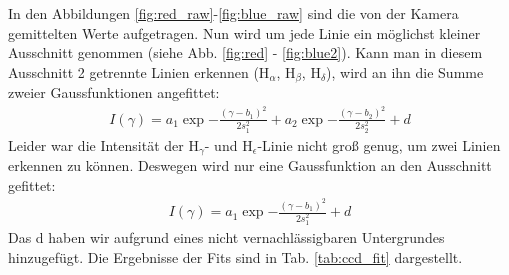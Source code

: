 In den Abbildungen \ref{fig:red_raw}-\ref{fig:blue_raw} sind die von der Kamera gemittelten Werte aufgetragen. Nun wird um jede Linie ein möglichst kleiner Ausschnitt genommen (siehe Abb. \ref{fig:red} - \ref{fig:blue2}). Kann man in diesem Ausschnitt 2 getrennte Linien erkennen (H$_\alpha$, H$_\beta$, H$_\delta$), wird an ihn die Summe zweier Gaussfunktionen angefittet:
\begin{align*}
I(\gamma) = a_1\exp{-\frac{(\gamma-b_1)^2}{2s_1^2}} + a_2\exp{-\frac{(\gamma-b_2)^2}{2s_2^2}} + d
\end{align*}
Leider war die Intensität der H$_\gamma$- und H$_\epsilon$-Linie nicht groß genug, um zwei Linien erkennen zu können. Deswegen wird nur eine Gaussfunktion an den Ausschnitt gefittet:
\begin{align*}
I(\gamma) = a_1\exp{-\frac{(\gamma-b_1)^2}{2s_1^2}} + d
\end{align*}
Das d haben wir aufgrund eines nicht vernachlässigbaren Untergrundes hinzugefügt. Die Ergebnisse der Fits sind in Tab. \ref{tab:ccd_fit} dargestellt.

